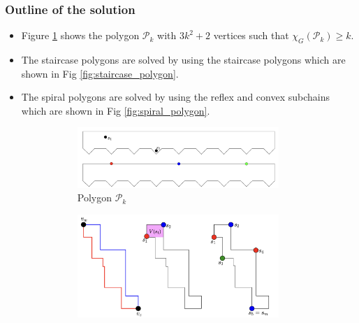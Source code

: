 \documentclass{Assignment}
\begin{document}
\subsubsection*{Outline of the solution}
\vspace{-0.3cm}
\begin{itemize}
    \itemsep-0.3em
    \item Figure \ref{fig:chromatic_lower_bound} shows the polygon $\mathcal{P}_k$ with $3k^2 + 2$ vertices such that $\chi_{G}(\mathcal{P}_k) \ge k$.
    \item The staircase polygons are solved by using the staircase polygons which are shown in Fig \ref{fig:staircase_polygon}.
    \item The spiral polygons are solved by using the reflex and convex subchains which are shown in Fig \ref{fig:spiral_polygon}.
    \begin{figure}[H]
        \centering
        \begin{minipage}{0.45\textwidth}
            \centering
            \vspace{-6.5cm}
            \begin{subfigure}[b]{\textwidth}
                \centering
                \includegraphics[width=0.9\textwidth]{images/lower_bound_chromatic.png}
                \caption{Polygon $\mathcal{P}_k$}
                \label{fig:chromatic_lower_bound}
            \end{subfigure}
            \vfill
            \begin{subfigure}[b]{\textwidth}
                \centering
                \includegraphics[width=0.9\textwidth]{images/staircase_polygon.png}

\end{subfigure}
\end{minipage}
\end{figure}
\end{itemize}
\end{document}
